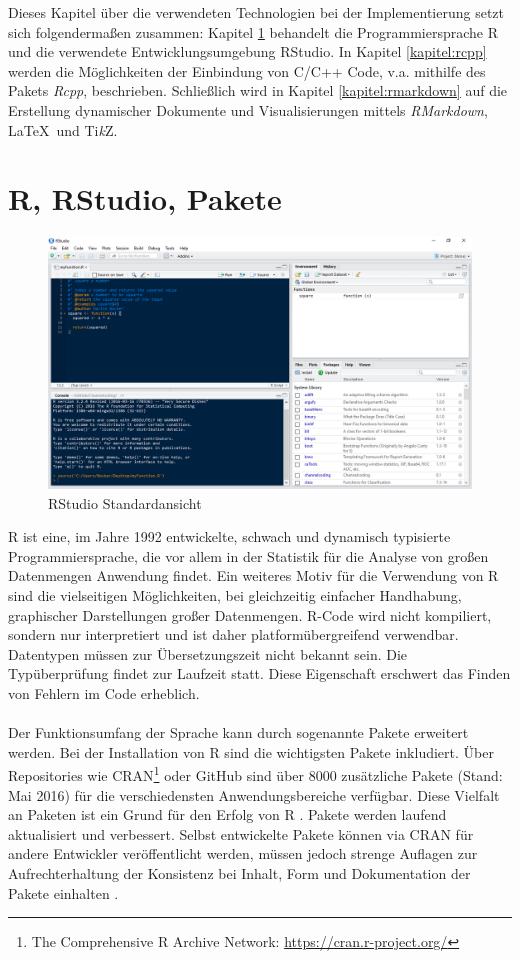 Dieses Kapitel über die verwendeten Technologien bei der Implementierung setzt sich folgendermaßen zusammen: Kapitel \ref{kapitel:R} behandelt die Programmiersprache R und die verwendete Entwicklungsumgebung RStudio. In Kapitel \ref{kapitel:rcpp} werden die Möglichkeiten der Einbindung von C/C++ Code, v.a. mithilfe des Pakets \emph{Rcpp}, beschrieben. Schließlich wird in Kapitel \ref{kapitel:rmarkdown} auf die Erstellung dynamischer Dokumente und Visualisierungen mittels \emph{RMarkdown}, \LaTeX\ und Ti\textit{k}Z.
\section{R, RStudio, Pakete}
\label{kapitel:R}
\begin{figure}[!t]
\centering
\includegraphics[width=\ScaleIfNeeded]{abbildungen/rstudio}
\caption{RStudio Standardansicht}
\label{abb:rstudio}
\end{figure}
R ist eine, im Jahre 1992 entwickelte, schwach und dynamisch typisierte Programmiersprache, die vor allem in der Statistik für die Analyse von großen Datenmengen Anwendung findet. Ein weiteres Motiv für die Verwendung von R sind die vielseitigen Möglichkeiten, bei gleichzeitig einfacher Handhabung, graphischer Darstellungen großer Datenmengen. R-Code wird nicht kompiliert, sondern nur interpretiert und ist daher platformübergreifend verwendbar. Datentypen müssen zur Übersetzungszeit nicht bekannt sein. Die Typüberprüfung findet zur Laufzeit statt. Diese Eigenschaft erschwert das Finden von Fehlern im Code erheblich.
\\
\\
Der Funktionsumfang der Sprache kann durch sogenannte Pakete erweitert werden. Bei der Installation von R sind die wichtigsten Pakete inkludiert. Über Repositories wie CRAN\footnote{The Comprehensive R Archive Network: \url{https://cran.r-project.org/}} oder GitHub sind über 8000 zusätzliche Pakete (Stand: Mai 2016) für die verschiedensten Anwendungsbereiche verfügbar. Diese Vielfalt an Paketen ist ein Grund für den Erfolg von R \cite{wickham2015r}. Pakete werden laufend aktualisiert und verbessert. Selbst entwickelte Pakete können via CRAN für andere Entwickler veröffentlicht werden, müssen jedoch strenge Auflagen zur Aufrechterhaltung der Konsistenz bei Inhalt, Form und Dokumentation der Pakete einhalten \cite{rmanual}.  
